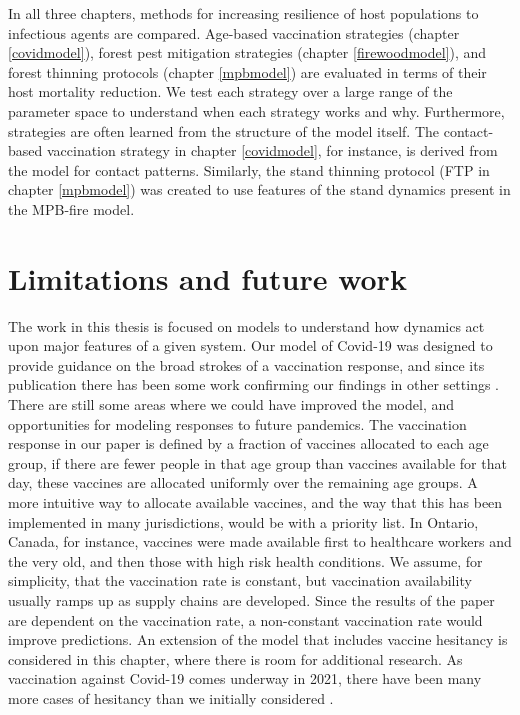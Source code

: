 In all three chapters, methods for increasing resilience of host populations to infectious agents are compared. Age-based vaccination strategies (chapter \ref{covidmodel}), forest pest mitigation strategies (chapter \ref{firewoodmodel}), and forest thinning protocols  (chapter \ref{mpbmodel}) are evaluated in terms of their host mortality reduction. We test each strategy over a large range of the parameter space to understand when each strategy works and why. Furthermore, strategies are often learned from the structure of the model itself. The contact-based vaccination strategy in chapter \ref{covidmodel}, for instance, is derived from the model for contact patterns. Similarly, the stand thinning protocol (FTP in chapter \ref{mpbmodel}) was created to use features of the stand dynamics present in the MPB-fire model. 


\section{Limitations and future work}

The work in this thesis is focused on models to understand how dynamics act upon major features of a given system. Our model of Covid-19 was designed to provide guidance on the broad strokes of a vaccination response, and since its publication there has been some work confirming our findings in other settings \cite{chen2021age,hogan2021within}. There are still some areas where we could have improved the model, and opportunities for modeling responses to future pandemics. The vaccination response in our paper is defined by a fraction of vaccines allocated to each age group, if there are fewer people in that age group than vaccines available for that day, these vaccines are allocated uniformly over the remaining age groups. A more intuitive way to allocate available vaccines, and the way that this has been implemented in many jurisdictions, would be with a priority list. In Ontario, Canada, for instance, vaccines were made available first to healthcare workers and the very old, and then those with high risk health conditions.  We assume, for simplicity, that the vaccination rate is constant, but vaccination availability usually ramps up as supply chains are developed. Since the results of the paper are dependent on the vaccination rate, a non-constant vaccination rate would improve predictions. An extension of the model that includes vaccine hesitancy is considered in this chapter, where there is room for additional research. As vaccination against Covid-19 comes underway in 2021, there have been many more cases of hesitancy than we initially considered \cite{schwarzinger2021covid,soares2021factors,callaghan2020correlates}. 

